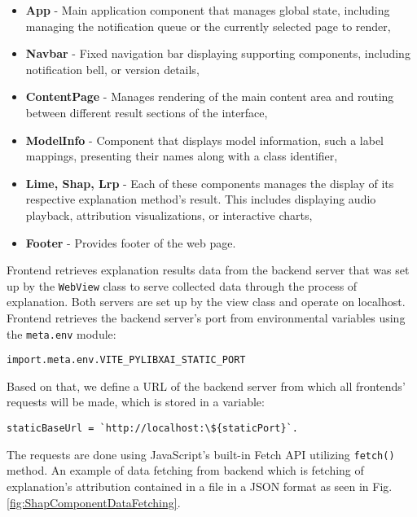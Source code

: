 \documentclass[
    bindingoffset=5mm,  %
    footnoteindent=3mm, %
    hyphenation=true    %
]{src/wut-thesis}
\begin{document}
\begin{itemize}[itemsep=1\baselineskip]
	\item \textbf{App} - Main application component that manages global state,
        including managing the notification queue or the currently selected page to render,
    \item \textbf{Navbar} - Fixed navigation bar displaying supporting components,
        including notification bell, or version details,
    \item \textbf{ContentPage} - Manages rendering of the main content area and
        routing between different result sections of the interface,
    \item \textbf{ModelInfo} - Component that displays model information,
        such a label mappings, presenting their names along with a class identifier,
    \item \textbf{Lime, Shap, Lrp} - Each of these components manages the display of its
        respective explanation method’s result. This includes displaying audio playback,
        attribution visualizations, or interactive charts,
    \item \textbf{Footer} - Provides footer of the web page.
\end{itemize}

Frontend retrieves explanation results data from the backend server that was set up by the
\texttt{WebView} class to serve collected data through the process of explanation.
Both servers are set up by the view class and operate on localhost. 
Frontend retrieves the backend server's port from environmental variables using the \texttt{meta.env}
module:
\begin{verbatim}
import.meta.env.VITE_PYLIBXAI_STATIC_PORT
\end{verbatim}

Based on that, we define a URL of the backend server from which all frontends’ requests
will be made, which is stored in a variable:
\begin{verbatim}
staticBaseUrl = `http://localhost:\${staticPort}`.
\end{verbatim}
The requests are done using JavaScript's built-in Fetch API utilizing \texttt{fetch()} method.
An example of data fetching from backend which is fetching of explanation's attribution
contained in a file in a JSON format as seen in Fig. \ref{fig:ShapComponentDataFetching}.
\end{document}
